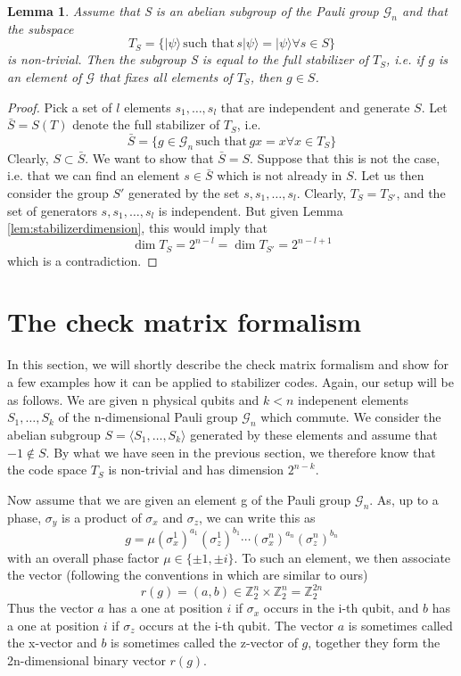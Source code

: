 \documentclass[a4paper, draft]{article}
\theoremstyle{own}
\newtheorem{lem}[thm]{Lemma}
\theoremstyle{remark}
\newcommand{\Z}{\mathbb{Z}}
\begin{document}
\begin{lem}
Assume that S is an abelian subgroup of the Pauli group $\mathcal{G}_n$ and that the subspace
$$
T_S = \{ |\psi \rangle \, \text{such that} \, s|\psi \rangle = |\psi \rangle 
\forall s \in S \}
$$
is non-trivial. Then the subgroup S is equal to the full stabilizer of $T_S$, i.e. if $g$ is an element of $\mathcal{G}$ that fixes all elements of $T_S$, then $g \in S$. 
\end{lem}

\begin{proof} Pick a set of $l$ elements $s_1, \dots, s_l$ that are independent and generate $S$. Let $\bar{S} = S(T)$ denote the full stabilizer of $T_S$, i.e. 
$$
\bar{S} = \{ g \in \mathcal{G}_n \, \text{such that} \, gx = x \forall x \in T_S \}
$$
Clearly, $S \subset \bar{S}$. We want to show that $\bar{S} = S$. Suppose that this is not the case, i.e. that we can find an element $s \in \bar{S}$ which is not already in $S$. Let us then consider the group $S'$ generated by the set $s, s_1, \dots, s_l$. Clearly, $T_S = T_{S'}$, and the set of generators $s, s_1, \dots, s_l$ is independent. But given Lemma \ref{lem:stabilizerdimension}, this would imply that
$$
\dim T_S = 2^{n-l} = \dim T_{S'} = 2^{n-l+1}
$$
which is a contradiction. 
\end{proof}

\section{The check matrix formalism}\label{sec:checkmatrixformalism}

In this section, we will shortly describe the check matrix formalism and show for a few examples how it can be applied to stabilizer codes. Again, our setup will be as follows. We are given n physical qubits and $k < n$ indepenent elements $S_1, \dots, S_k$ of the n-dimensional Pauli group $\mathcal{G}_n$ which commute. We consider the abelian subgroup $S = \langle S_1, \dots, S_k \rangle$ generated by these elements and assume that $-1 \notin S$. By what we have seen in the previous section, we therefore know that the code space $T_S$ is non-trivial and has dimension $2^{n-k}$. 

Now assume that we are given an element g of the Pauli group $\mathcal{G}_n$. As, up to a phase, $\sigma_y$ is a product of $\sigma_x$ and $\sigma_z$, we can write this as
$$
g = \mu (\sigma_x^1)^{a_1} (\sigma_z^1)^{b_1} \cdots (\sigma_x^n)^{a_n} (\sigma_z^n)^{b_n}
$$
with an overall phase factor $\mu \in \{ \pm 1, \pm i \}$. To such an element, we then associate the vector (following the conventions in \cite{GThesis} which are similar to ours)
$$
r(g) = (a , b) \in \Z_2^n \times \Z_2^n = \Z_2^{2n}
$$
Thus the vector $a$ has a one at position $i$ if $\sigma_x$ occurs in the i-th qubit, and $b$ has a one at position $i$ if $\sigma_z$ occurs at the i-th qubit. The vector $a$ is sometimes called the x-vector and $b$ is sometimes called the z-vector of $g$, together they form the 2n-dimensional binary vector $r(g)$.
\end{document}
